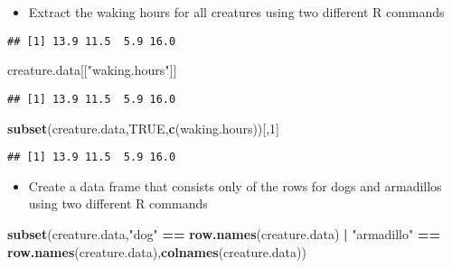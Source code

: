 \documentclass[]{article}
\newenvironment{Shaded}{\begin{snugshade}}{\end{snugshade}}
\newcommand{\KeywordTok}[1]{\textcolor[rgb]{0.13,0.29,0.53}{\textbf{#1}}}
\newcommand{\DecValTok}[1]{\textcolor[rgb]{0.00,0.00,0.81}{#1}}
\newcommand{\StringTok}[1]{\textcolor[rgb]{0.31,0.60,0.02}{#1}}
\newcommand{\OtherTok}[1]{\textcolor[rgb]{0.56,0.35,0.01}{#1}}
\newcommand{\OperatorTok}[1]{\textcolor[rgb]{0.81,0.36,0.00}{\textbf{#1}}}
\newcommand{\NormalTok}[1]{#1}
\providecommand{\tightlist}{%
  \setlength{\itemsep}{0pt}\setlength{\parskip}{0pt}}
\begin{document}
\begin{itemize}
\tightlist
\item
  Extract the waking hours for all creatures using two different R
  commands
\end{itemize}

\begin{Shaded}
\end{Shaded}

\begin{verbatim}
## [1] 13.9 11.5  5.9 16.0
\end{verbatim}

\begin{Shaded}
\begin{Highlighting}[]
\NormalTok{creature.data[[}\StringTok{"waking.hours"}\NormalTok{]]}
\end{Highlighting}
\end{Shaded}

\begin{verbatim}
## [1] 13.9 11.5  5.9 16.0
\end{verbatim}

\begin{Shaded}
\begin{Highlighting}[]
\KeywordTok{subset}\NormalTok{(creature.data,}\OtherTok{TRUE}\NormalTok{,}\KeywordTok{c}\NormalTok{(waking.hours))[,}\DecValTok{1}\NormalTok{]}
\end{Highlighting}
\end{Shaded}

\begin{verbatim}
## [1] 13.9 11.5  5.9 16.0
\end{verbatim}

\begin{itemize}
\tightlist
\item
  Create a data frame that consists only of the rows for dogs and
  armadillos using two different R commands
\end{itemize}

\begin{Shaded}
\begin{Highlighting}[]
\KeywordTok{subset}\NormalTok{(creature.data,}\StringTok{"dog"} \OperatorTok{==}\StringTok{ }\KeywordTok{row.names}\NormalTok{(creature.data) }\OperatorTok{|}\StringTok{ "armadillo"} \OperatorTok{==}\StringTok{ }\KeywordTok{row.names}\NormalTok{(creature.data),}\KeywordTok{colnames}\NormalTok{(creature.data))}
\end{Highlighting}
\end{Shaded}
\end{document}
